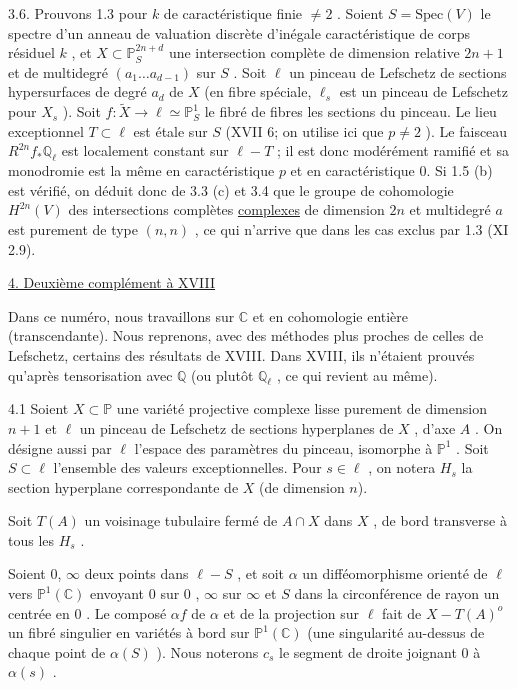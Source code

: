 3.6. \quad Prouvons 1.3 pour $k$ de caractéristique finie $\neq 2$ . Soient $S = \mathrm{Spec}(V)$ le spectre d'un anneau de valuation discrète d'inégale caractéristique de corps résiduel $k$ , et $X \subset \mathbb{P}^{2n+d}_S$ une intersection complète de dimension relative $2n+1$ et de multidegré $(a_1 \ldots a_{d-1})$ sur $S$ . Soit $\ell$ un pinceau de Lefschetz de sections hypersurfaces de degré $a_d$ de $X$ (en fibre spéciale, $\ell_s$ est un pinceau de Lefschetz pour $X_s$ ). Soit $f : \widetilde{X} \longrightarrow \ell \simeq \mathbb{P}^1_S$ le fibré de fibres les sections du pinceau. Le lieu exceptionnel $T \subset \ell$ est étale sur $S$ (XVII 6; on utilise ici que $p \neq 2$ ). Le faisceau $R^{2n} f_* \mathbb{Q}_\ell$ est localement constant sur $\ell - T$ ; il est donc modérément ramifié et sa monodromie est la même en caractéristique $p$ et en caractéristique $0$. Si 1.5 (b) est vérifié, on déduit donc de 3.3 (c) et 3.4 que le groupe de cohomologie $H^{2n}(V)$ des intersections complètes \underline{complexes} de dimension $2n$ et multidegré \underline{$a$} est purement de type $(n, n)$ , ce qui n'arrive que dans les cas exclus par 1.3 (XI 2.9).


\underline{4. Deuxième complément à XVIII}

Dans ce numéro, nous travaillons sur $\mathbb{C}$ et en cohomologie entière (transcendante). Nous reprenons, avec des méthodes plus proches de celles de Lefschetz, certains des résultats de XVIII. Dans XVIII, ils n'étaient prouvés qu'après tensorisation avec $\mathbb{Q}$ (ou plutôt $\mathbb{Q}_\ell$ , ce qui revient au même).

4.1 \quad Soient $X \subset \mathbb{P}$ une variété projective complexe lisse purement de dimension $n + 1$ et $\ell$ un pinceau de Lefschetz de sections hyperplanes de $X$ , d'axe $A$ . On désigne aussi par $\ell$ l'espace des paramètres du pinceau, isomorphe à $\mathbb{P}^1$ . Soit $S \subset \ell$ l'ensemble des valeurs exceptionnelles. Pour $s \in \ell$ , on notera $H_s$ la section hyperplane correspondante de $X$ (de dimension $n$).



Soit $T(A)$ un voisinage tubulaire fermé de $A \cap X$ dans $X$ , de bord transverse à tous les $H_s$ .

Soient $0$, $\infty$ deux points dans $\ell - S$ , et soit $\alpha$ un difféomorphisme orienté de $\ell$ vers $\mathbb{P}^1(\mathbb{C})$ envoyant $0$ sur $0$ , $\infty$ sur $\infty$ et $S$ dans la circonférence de rayon un centrée en $0$ . Le composé $\alpha f$ de $\alpha$ et de la projection sur $\ell$ fait de $X - T(A)^o$ un fibré singulier en variétés à bord sur $\mathbb{P}^1(\mathbb{C})$ (une singularité au-dessus de chaque point de $\alpha(S)$ ). Nous noterons $c_s$ le segment de droite joignant $0$ à $\alpha(s)$ .

